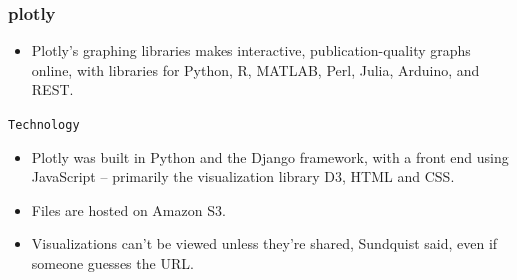 \documentclass{beamer}
\begin{document}
\begin{frame}
\frametitle{plotly}
\large	
\begin{itemize}
	\item Plotly's graphing libraries makes interactive, publication-quality graphs online, with libraries for Python, R, MATLAB, Perl, Julia, Arduino, and REST.
\end{itemize}
\end{frame}

\begin{frame}
	\large
	\texttt{Technology}
\begin{itemize}
	\item Plotly was built in Python and the Django framework, with a front end using JavaScript -- primarily the visualization library D3, HTML and CSS. 
	\item Files are hosted on Amazon S3. 
	\item Visualizations can't be viewed unless they're shared, Sundquist said, even if someone guesses the URL.
\end{itemize}

	
\end{frame}
\end{document}
